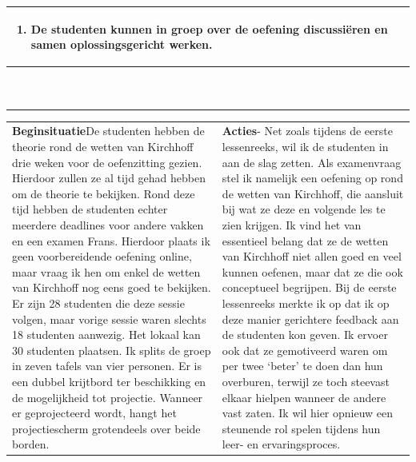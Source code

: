 \begin{landscape}
\begin{tabularx}{1.56\textwidth}{|p{}|X|}
\begin{enumerate}[itemsep=0.08\baselineskip]
		    \item De studenten kunnen in groep over de oefening discussiëren en samen oplossingsgericht werken.
		\end{enumerate} \\\hline
	\multicolumn{2}{c}{ }\\
	\multicolumn{2}{c}{ }\\
	\multicolumn{2}{c}{ }\\
	\multicolumn{2}{c}{ }\\
	\multicolumn{2}{c}{ }\\
	\multicolumn{2}{c}{ }\\
	\multicolumn{2}{c}{ }\\
	\multicolumn{2}{c}{ }\\
	\multicolumn{2}{c}{ }\\
	\multicolumn{2}{c}{ }\\
	\end{tabularx}


	\begin{tabularx}{1.56\textwidth}{|p{}|X|}
		\hline
		\multirow{2}{0.55\textwidth}{\textbf{Beginsituatie}\newline De studenten hebben de theorie rond de wetten van Kirchhoff drie weken voor de oefenzitting gezien. Hierdoor zullen ze al tijd gehad hebben om de theorie te bekijken. Rond deze tijd hebben de studenten echter meerdere deadlines voor andere vakken en een examen Frans. Hierdoor plaats ik geen voorbereidende oefening online, maar vraag ik hen om enkel de wetten van Kirchhoff nog eens goed te bekijken. \newline\newline Er zijn 28 studenten die deze sessie volgen, maar vorige sessie waren slechts 18 studenten aanwezig. \newline\newline Het lokaal kan 30 studenten plaatsen. Ik splits de groep in zeven tafels van vier personen. Er is een dubbel krijtbord ter beschikking en de mogelijkheid tot projectie. Wanneer er geprojecteerd wordt, hangt het projectiescherm grotendeels over beide borden.  }& \textbf{Acties}\newline  - Net zoals tijdens de eerste lessenreeks, wil ik de studenten in \GreenHighlight{groepjes van vier studenten}{5cm} aan de slag zetten. Als examenvraag stel ik namelijk een oefening op rond de wetten van Kirchhoff, die aansluit bij wat ze deze en volgende les te zien krijgen. Ik vind het van essentieel belang dat ze de wetten van Kirchhoff niet allen goed en veel kunnen oefenen, maar dat ze die ook conceptueel begrijpen. Bij de eerste lessenreeks merkte ik op dat ik op deze manier gerichtere feedback aan de studenten kon geven. Ik ervoer ook dat ze gemotiveerd waren om per twee `beter' te doen dan hun overburen, terwijl ze toch steevast elkaar hielpen wanneer de andere vast zaten. Ik wil hier opnieuw een steunende rol spelen tijdens hun leer- en ervaringsproces.  \newline\newline
		

\end{tabularx}
\end{landscape}
